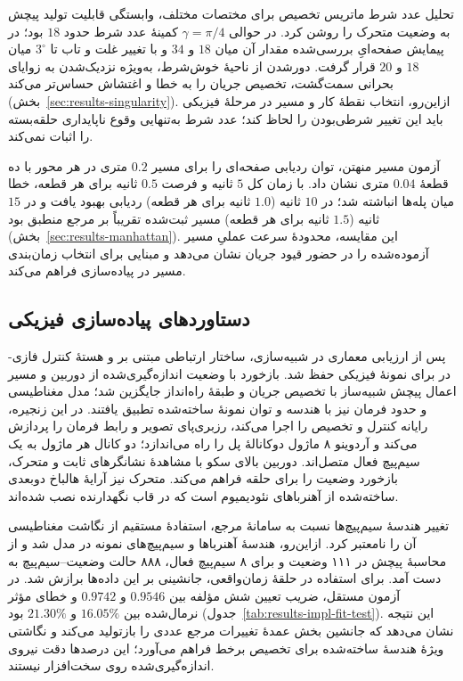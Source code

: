 تحلیل عدد شرط ماتریس تخصیص برای مختصات مختلف، وابستگی قابلیت تولید پیچش به وضعیت متحرک را روشن کرد. در حوالی $\gamma=\pi/4$ کمینهٔ عدد شرط حدود $18$ بود؛ در پیمایش صفحه‌ایِ بررسی‌شده مقدار آن میان $18$ و $34$ و با تغییر غلت و تاب تا $3^\circ$ میان $18$ و $20$ قرار گرفت. دورشدن از ناحیهٔ خوش‌شرط، به‌ویژه نزدیک‌شدن به زوایای بحرانی سمت‌گشت، تخصیص جریان را به خطا و اغتشاش حساس‌تر می‌کند (بخش~\ref{sec:results-singularity}). ازاین‌رو، انتخاب نقطهٔ کار و مسیر در مرحلهٔ فیزیکی باید این تغییر شرطی‌بودن را لحاظ کند؛ عدد شرط به‌تنهایی وقوع ناپایداری حلقه‌بسته را اثبات نمی‌کند.

آزمون مسیر منهتن، توان ردیابی صفحه‌ای را برای مسیر $0.2$ متری در هر محور با ده قطعهٔ $0.04$ متری نشان داد. با زمان کل $5$ ثانیه و فرصت $0.5$ ثانیه برای هر قطعه، خطا میان پله‌ها انباشته شد؛ در $10$ ثانیه ($1.0$ ثانیه برای هر قطعه) ردیابی بهبود یافت و در $15$ ثانیه ($1.5$ ثانیه برای هر قطعه) مسیر ثبت‌شده تقریباً بر مرجع منطبق بود (بخش~\ref{sec:results-manhattan}). این مقایسه، محدودهٔ سرعت عملیِ مسیر آزموده‌شده را در حضور قیود جریان نشان می‌دهد و مبنایی برای انتخاب زمان‌بندی مسیر در پیاده‌سازی فراهم می‌کند.

\subsection{دستاوردهای پیاده‌سازی فیزیکی}
\label{subsec:results-impl-demonstrated}

پس از ارزیابی معماری در شبیه‌سازی، ساختار ارتباطی مبتنی بر  و هستهٔ کنترل فازی- در  برای نمونهٔ فیزیکی حفظ شد. بازخورد  با وضعیت اندازه‌گیری‌شده از دوربین و مسیر اعمال پیچش شبیه‌ساز با تخصیص جریان و طبقهٔ راه‌انداز جایگزین شد؛ مدل مغناطیسی و حدود فرمان نیز با هندسه و توان نمونهٔ ساخته‌شده تطبیق یافتند. در این زنجیره، رایانه کنترل و تخصیص را اجرا می‌کند، رزبری‌پای تصویر و رابط فرمان را پردازش می‌کند و آردوینو ۸ ماژول دوکانالهٔ پل  را راه می‌اندازد؛ دو کانال هر ماژول به یک سیم‌پیچ فعال متصل‌اند. دوربین بالای سکو با مشاهدهٔ نشانگرهای  ثابت و متحرک، بازخورد وضعیت را برای حلقه فراهم می‌کند. متحرک نیز آرایهٔ هالباخ دوبعدی ساخته‌شده از آهنرباهای نئودیمیوم است که در قاب نگهدارنده نصب شده‌اند.

تغییر هندسهٔ سیم‌پیچ‌ها نسبت به سامانهٔ مرجع، استفادهٔ مستقیم از نگاشت مغناطیسی آن را نامعتبر کرد. ازاین‌رو، هندسهٔ آهنرباها و سیم‌پیچ‌های نمونه در  مدل شد و از محاسبهٔ پیچش در ۱۱۱ وضعیت و برای ۸ سیم‌پیچ فعال، ۸۸۸ حالت وضعیت--سیم‌پیچ به دست آمد. برای استفاده در حلقهٔ زمان‌واقعی، جانشینی بر این داده‌ها برازش شد. در آزمون مستقل، ضریب تعیین شش مؤلفه بین $0.9546$ و $0.9742$ و خطای مؤثر نرمال‌شده بین $16.05\%$ و $21.30\%$ بود (جدول~\ref{tab:results-impl-fit-test}). این نتیجه نشان می‌دهد که جانشین بخش عمدهٔ تغییرات مرجع عددی را بازتولید می‌کند و نگاشتی ویژهٔ هندسهٔ ساخته‌شده برای تخصیص برخط فراهم می‌آورد؛ این درصدها دقت نیروی اندازه‌گیری‌شده روی سخت‌افزار نیستند.

